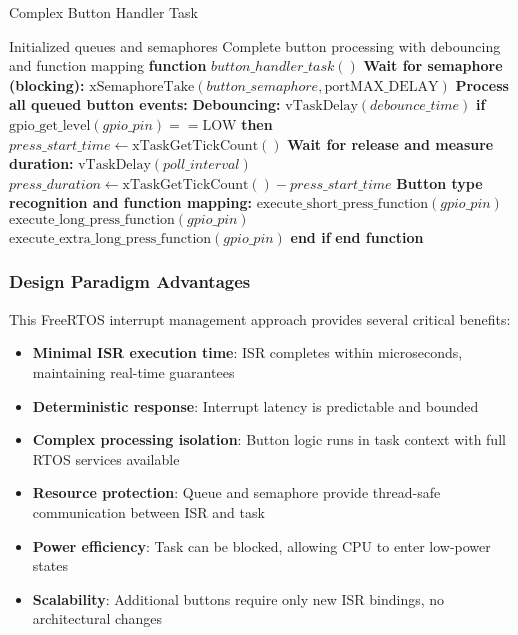 \documentclass{article}
\begin{document}
\begin{algorithm}
\caption{Complex Button Handler Task}
\label{alg:button_task}
\begin{algorithmic}[1]
\REQUIRE Initialized queues and semaphores
\ENSURE Complete button processing with debouncing and function mapping
\STATE \textbf{function} $button\_handler\_task()$
    \STATE \textbf{Wait for semaphore (blocking):}
    \STATE $\text{xSemaphoreTake}(button\_semaphore, \text{portMAX\_DELAY})$
    \STATE
    \STATE \textbf{Process all queued button events:}
        \STATE \textbf{Debouncing:}
        \STATE $\text{vTaskDelay}(debounce\_time)$ 
        \STATE \textbf{if} $\text{gpio\_get\_level}(gpio\_pin) == \text{LOW}$ \textbf{then}
            \STATE $press\_start\_time \leftarrow \text{xTaskGetTickCount}()$
            \STATE \textbf{Wait for release and measure duration:}
                \STATE $\text{vTaskDelay}(poll\_interval)$
            \ENDWHILE
            \STATE $press\_duration \leftarrow \text{xTaskGetTickCount}() - press\_start\_time$
            \STATE
            \STATE \textbf{Button type recognition and function mapping:}
                \STATE $\text{execute\_short\_press\_function}(gpio\_pin)$
                \STATE $\text{execute\_long\_press\_function}(gpio\_pin)$
            \ELSE
                \STATE $\text{execute\_extra\_long\_press\_function}(gpio\_pin)$
            \ENDIF
        \STATE \textbf{end if}
    \ENDWHILE
\ENDWHILE
\STATE \textbf{end function}
\end{algorithmic}
\end{algorithm}

\subsubsection{Design Paradigm Advantages}

This FreeRTOS interrupt management approach provides several critical benefits:

\begin{itemize}
    \item \textbf{Minimal ISR execution time}: ISR completes within microseconds, maintaining real-time guarantees
    \item \textbf{Deterministic response}: Interrupt latency is predictable and bounded
    \item \textbf{Complex processing isolation}: Button logic runs in task context with full RTOS services available
    \item \textbf{Resource protection}: Queue and semaphore provide thread-safe communication between ISR and task
    \item \textbf{Power efficiency}: Task can be blocked, allowing CPU to enter low-power states
    \item \textbf{Scalability}: Additional buttons require only new ISR bindings, no architectural changes
\end{itemize}
\end{document}

